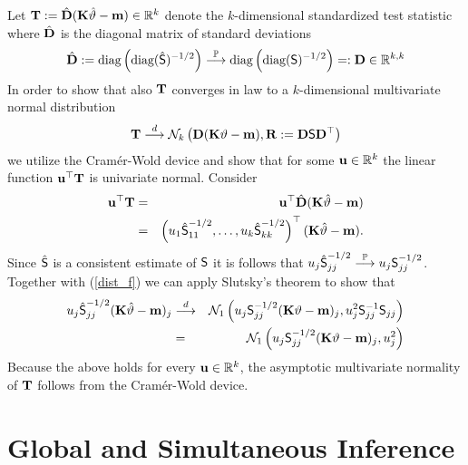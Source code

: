 \documentclass[12pt]{article}
\begin{document}
Let $\T := \hat{\D} (\K \hat{\vartheta} - \m) \in \R^k$ denote
the $k$-dimensional standardized test statistic where $\hat{\D}$ is the diagonal
matrix of standard deviations
\begin{eqnarray*}
\hat{\D} := \text{diag}\left(\text{diag}(\hat{\S})^{-1/2}\right) \cP 
\text{diag}\left(\text{diag}(\S)^{-1/2}\right) =: \D \in \R^{k,k}
\end{eqnarray*}
In order to show that also $\T$ converges in law to a $k$-dimensional multivariate
normal distribution
\begin{eqnarray*}
\T \cL \N_k\left(\D(\K \vartheta - \m), \Cor := \D \S \D^\top\right)
\end{eqnarray*}
we utilize the Cram{\'e}r-Wold device and show that for some $\uu \in \R^k$ 
the linear function $\uu^\top \T$ is univariate normal. Consider
\begin{eqnarray*}
\uu^\top \T & = & \uu^\top \hat{\D} (\K \hat{\vartheta} - \m) \\
& = & \left(u_1 \hat{\S}_{11}^{-1/2}, \dots, u_k \hat{\S}_{kk}^{-1/2}\right)^\top(\K \hat{\vartheta} - \m).
\end{eqnarray*}
Since $\hat{\S}$ is a consistent estimate of $\S$ it 
is follows that $u_j \hat{\S}_{jj}^{-1/2} \cP u_j \S_{jj}^{-1/2}$.
Together with (\ref{dist_f}) we can apply Slutsky's theorem to show that
\begin{eqnarray*}
u_j \hat{\S}_{jj}^{-1/2} (\K \hat{\vartheta} - \m)_j & \cL &  
\N_1\left(u_j \S_{jj}^{-1/2} (\K \vartheta - \m)_j, u_j^2 \S_{jj}^{-1} \S_{jj}\right) \\
& = & \N_1\left(u_j \S_{jj}^{-1/2} (\K \vartheta - \m)_j, u_j^2\right)
\end{eqnarray*}
Because the above holds for every $\uu \in \R^k$, the asymptotic multivariate
normality of $\T$ follows from the Cram{\'e}r-Wold device. 


\section{Global and Simultaneous Inference} \label{siminf}
\end{document}
